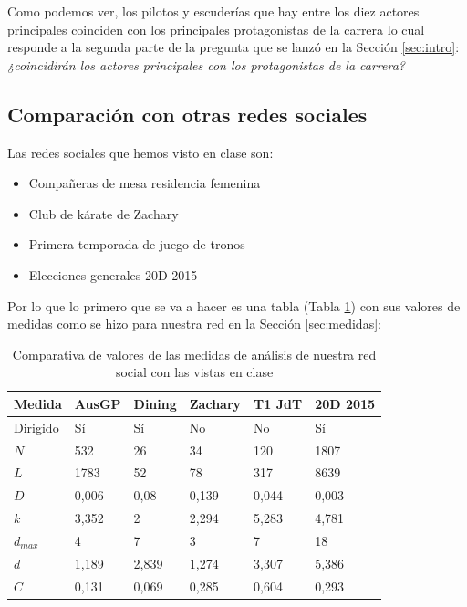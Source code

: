 Como podemos ver, los pilotos y escuderías que hay entre los diez actores principales coinciden con los principales protagonistas de la carrera lo cual responde a la segunda parte de la pregunta que se lanzó en la Sección \ref{sec:intro}: \textit{¿coincidirán los actores principales con los protagonistas de la carrera?}

\subsection{Comparación con otras redes sociales}

Las redes sociales que hemos visto en clase son:

\begin{itemize}
	\item Compañeras de mesa residencia femenina
	\item Club de kárate de Zachary
	\item Primera temporada de juego de tronos
	\item Elecciones generales 20D 2015
\end{itemize}

Por lo que lo primero que se va a hacer es una tabla (Tabla \ref{tab:comparacion-medidas}) con sus valores de medidas como se hizo para nuestra red en la Sección \ref{sec:medidas}:

\begin{table}[H]
	\centering
	\caption{Comparativa de valores de las medidas de análisis de nuestra red social con las vistas en clase}
	\label{tab:comparacion-medidas}
	\begin{tabular}{| l | l l l l l|}
		\hline
		Medida    & AusGP & Dining & Zachary & T1 JdT & 20D 2015 \\ 
		\hline
		Dirigido  & Sí    & Sí     & No      & No     & Sí       \\
		$N$       & 532   & 26     & 34      & 120    & 1807     \\
		$L$       & 1783  & 52     & 78      & 317    & 8639     \\
		$D$       & 0,006 & 0,08   & 0,139   & 0,044  & 0,003    \\
		$k$       & 3,352 & 2      & 2,294   & 5,283  & 4,781    \\
		$d_{max}$ & 4     & 7      & 3       & 7      & 18       \\
		$d$       & 1,189 & 2,839  & 1,274   & 3,307  & 5,386    \\
		$C$       & 0,131 & 0,069  & 0,285   & 0,604  & 0,293    \\
		\hline
	\end{tabular}
\end{table}

